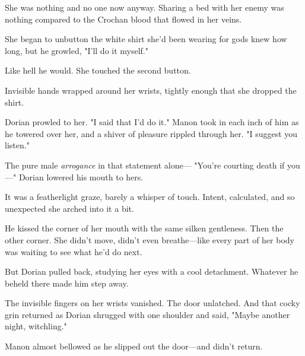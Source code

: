 She was nothing and no one now anyway.
Sharing a bed with her enemy was nothing compared to the Crochan blood that flowed in her veins.

She began to unbutton the white shirt she'd been wearing for gods knew how long, but he growled, "I'll do it myself."

Like hell he would.
She touched the second button.

Invisible hands wrapped around her wrists, tightly enough that she dropped the shirt.

Dorian prowled to her.
"I said that I'd do it."
Manon took in each inch of him as he towered over her, and a shiver of pleasure rippled through her.
"I suggest you listen."

The pure male \emph{arrogance} in that statement alone--- "You're courting death if you---" Dorian lowered his mouth to hers.

It was a featherlight graze, barely a whisper of touch.
Intent, calculated, and so unexpected she arched into it a bit.

He kissed the corner of her mouth with the same silken gentleness.
Then the other corner.
She didn't move, didn't even breathe---like every part of her body was waiting to see what he'd do next.

But Dorian pulled back, studying her eyes with a cool detachment.
Whatever he beheld there made him step away.

The invisible fingers on her wrists vanished.
The door unlatched.
And that cocky grin returned as Dorian shrugged with one shoulder and said, "Maybe another night, witchling."

Manon almost bellowed as he slipped out the door---and didn't return.
